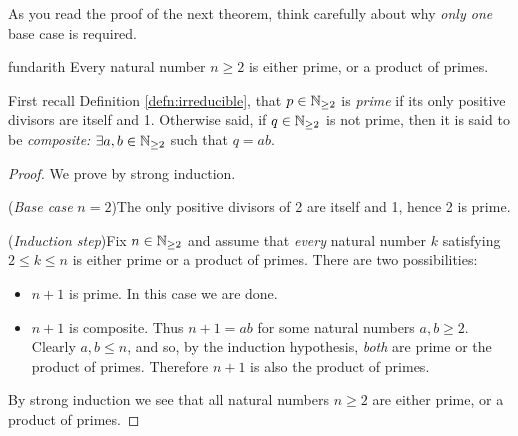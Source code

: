 As you read the proof of the next theorem, think carefully about why \emph{only one} base case is required.

\begin{thm}{}{fundarith}
	Every natural number $n\ge 2$ is either prime, or a product of primes.
\end{thm}

First recall Definition \ref{defn:irreducible}, that $p\in\mathbb{N}_{\ge 2}$ is \emph{prime} if its only positive divisors are itself and 1. Otherwise said, if $q\in\mathbb{N}_{\ge 2}$ is not prime, then it is said to be \emph{composite:} $\exists a,b\in\mathbb{N}_{\ge 2}$ such that $q=ab$.

\begin{proof}
	We prove by strong induction.\par
	(\emph{Base case} $n=2$)\quad The only positive divisors of 2 are itself and 1, hence 2 is prime.\par
	(\emph{Induction step})\quad Fix $n\in\mathbb{N}_{\ge 2}$ and assume that \emph{every} natural number $k$ satisfying $2\le k\le n$ is either prime or a product of primes. There are two possibilities:
	\begin{itemize}
	  \item $n+1$ is prime. In this case we are done.
	  \item $n+1$ is composite. Thus $n+1=ab$ for some natural numbers $a,b\ge 2$. Clearly $a,b\le n$, and so, by the induction hypothesis, \emph{both} are prime or the product of primes. Therefore $n+1$ is also the product of primes.
	\end{itemize}
	By strong induction we see that all natural numbers $n\ge 2$ are either prime, or a product of primes.
\end{proof}
% 
% 

